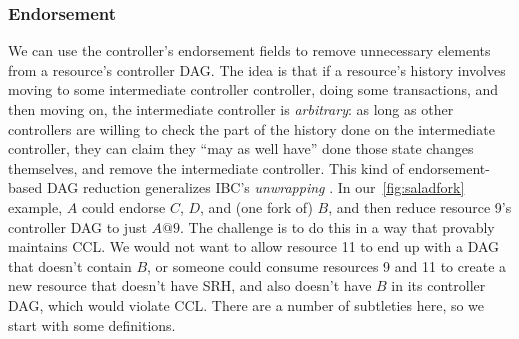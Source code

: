\documentclass[a4paper,USenglish,cleveref, autoref, thm-restate, anonymous]{lipics-v2021}
\begin{document}
\begin{center}
\end{center}

\subsubsection{Endorsement}
We can use the controller's endorsement fields to remove unnecessary elements from a resource's controller DAG.
The idea is that if a resource's history involves moving to some intermediate controller controller, doing some transactions, and then moving on, the intermediate controller is \textit{arbitrary}: as long as other controllers are willing to check the part of the history done on the intermediate controller, they can claim they ``may as well have'' done those state changes themselves, and remove the intermediate controller.
This kind of endorsement-based DAG reduction generalizes IBC's \emph{unwrapping} \cite{wrapped,ibc}.
In our~\cref{fig:saladfork} example, $A$ could endorse $C$, $D$, and (one fork of) $B$, and then reduce resource 9's controller DAG to just $A@9$.
The challenge is to do this in a way that provably maintains CCL. 
We would not want to allow resource 11 to end up with a DAG that doesn't contain $B$, or someone could consume resources 9 and 11 to create a new resource that doesn't have SRH, and also doesn't have $B$ in its controller DAG, which would violate CCL.
There are a number of subtleties here, so we start with some definitions.
\end{document}

